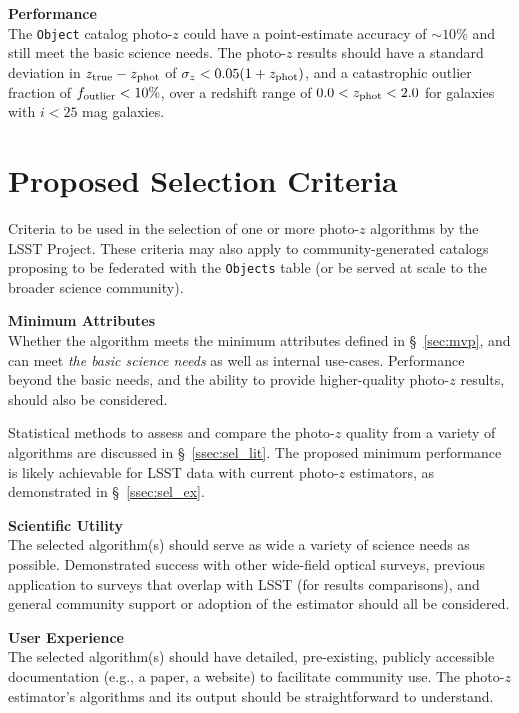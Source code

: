 \documentclass[DM,lsstdraft,toc]{lsstdoc}
\begin{document}
{\bf Performance}\\
The {\tt Object} catalog photo-$z$ could have a point-estimate accuracy of $\sim10\%$ and still meet the basic science needs.
The photo-$z$ results should have a standard deviation in $z_{\rm true}-z_{\rm phot}$ of $\sigma_z < 0.05(1+z_{\rm phot})$, and a catastrophic outlier fraction of $f_{\rm outlier} < 10\%$, over a redshift range of $0.0 < z_{\rm phot} < 2.0$ for galaxies with $i<25$ mag galaxies.



\clearpage
\section{Proposed Selection Criteria} \label{sec:sel}

Criteria to be used in the selection of one or more photo-$z$ algorithms by the LSST Project. These criteria may also apply to community-generated catalogs proposing to be federated with the {\tt Objects} table (or be served at scale to the broader science community).

{\bf Minimum Attributes}\\
Whether the algorithm meets the minimum attributes defined in \S~\ref{sec:mvp}, and can meet {\it the basic science needs} as well as internal use-cases.
Performance beyond the basic needs, and the ability to provide higher-quality photo-$z$ results, should also be considered.

Statistical methods to assess and compare the photo-$z$ quality from a variety of algorithms are discussed in \S~\ref{ssec:sel_lit}.
The proposed minimum performance is likely achievable for LSST data with current photo-$z$ estimators, as demonstrated in \S~\ref{ssec:sel_ex}.

{\bf Scientific Utility}\\
The selected algorithm(s) should serve as wide a variety of science needs as possible.
Demonstrated success with other wide-field optical surveys, previous application to surveys that overlap with LSST (for results comparisons), and general community support or adoption of the estimator should all be considered.

{\bf User Experience}\\
The selected algorithm(s) should have detailed, pre-existing, publicly accessible documentation (e.g., a paper, a website) to facilitate community use.
The photo-$z$ estimator's algorithms and its output should be straightforward to understand. 
\end{document}

